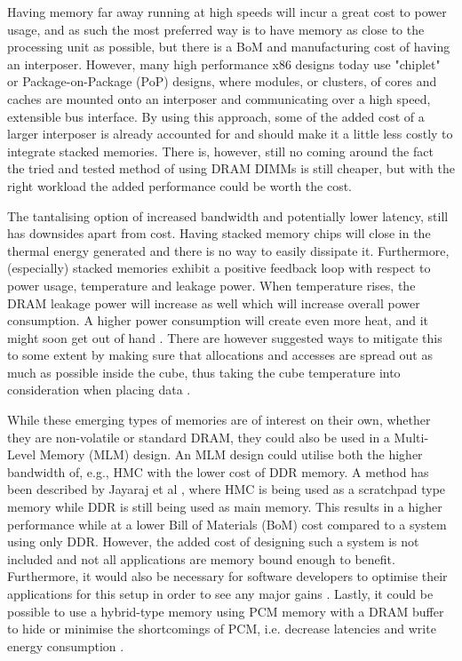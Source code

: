 Having memory far away running at high speeds will incur a great cost to power usage, and as such the most preferred way is to have memory as close to the processing unit as possible, but there is a BoM and manufacturing cost of having an interposer. However, many high performance x86 designs today use "chiplet" or Package-on-Package (PoP) designs, where modules, or clusters, of cores and caches are mounted onto an interposer and communicating over a high speed, extensible bus interface. By using this approach, some of the added cost of a larger interposer is already accounted for and should make it a little less costly to integrate stacked memories. There is, however, still no coming around the fact the tried and tested method of using DRAM DIMMs is still cheaper, but with the right workload the added performance could be worth the cost.
\bigskip

The tantalising option of increased bandwidth and potentially lower latency, still has downsides apart from cost. Having stacked memory chips will close in the thermal energy generated and there is no way to easily dissipate it. Furthermore, (especially) stacked memories exhibit a positive feedback loop with respect to power usage, temperature and leakage power. When temperature rises, the DRAM leakage power will increase as well which will increase overall power consumption. A higher power consumption will create even more heat, and it might soon get out of hand \cite{4212027}. There are however suggested ways to mitigate this to some extent by making sure that allocations and accesses are spread out as much as possible inside the cube, thus taking the cube temperature into consideration when placing data \cite{7252085}.
\bigskip

While these emerging types of memories are of interest on their own, whether they are non-volatile or standard DRAM, they could also be used in a Multi-Level Memory (MLM) design. An MLM design could utilise both the higher bandwidth of, e.g., HMC with the lower cost of DDR memory. A method has been described by Jayaraj et al \cite{Jayaraj:2015:PPM:2818950.2818976}, where HMC is being used as a scratchpad type memory while DDR is still being used as main memory. This results in a higher performance while at a lower Bill of Materials (BoM) cost compared to a system using only DDR. However, the added cost of designing such a system is not included and not all applications are memory bound enough to benefit. Furthermore, it would also be necessary for software developers to optimise their applications for this setup in order to see any major gains \cite{Bender:2015:KCT:2818950.2818977}\cite{BENDER2017213}. Lastly, it could be possible to use a hybrid-type memory using PCM memory with a DRAM buffer to hide or minimise the shortcomings of PCM, i.e. decrease latencies and write energy consumption \cite{Lee:2009:APC:1555815.1555758}.
\bigskip


